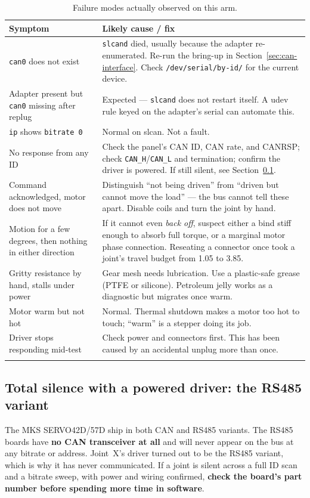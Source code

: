 \documentclass[11pt,letterpaper]{article}
\begin{document}
\begin{longtable}{p{}p{}}
\toprule
\textbf{Symptom} & \textbf{Likely cause / fix} \\ \midrule
\endhead
\texttt{can0} does not exist &
  \texttt{slcand} died, usually because the adapter re-enumerated. Re-run the
  bring-up in Section~\ref{sec:can-interface}. Check
  \texttt{/dev/serial/by-id/} for the current device. \\
Adapter present but \texttt{can0} missing after replug &
  Expected --- \texttt{slcand} does not restart itself. A udev rule keyed on the
  adapter's serial can automate this. \\
\texttt{ip} shows \texttt{bitrate 0} &
  Normal on slcan. Not a fault. \\
No response from any ID &
  Check the panel's CAN ID, CAN rate, and CANRSP; check \texttt{CAN\_H}/\texttt{CAN\_L}
  and termination; confirm the driver is powered. If still silent, see
  Section~\ref{sec:rs485}. \\
Command acknowledged, motor does not move &
  Distinguish ``not being driven'' from ``driven but cannot move the load'' --- the
  bus cannot tell these apart. Disable coils and turn the joint by hand. \\
Motion for a few degrees, then nothing in either direction &
  If it cannot even \emph{back off}, suspect either a bind stiff enough to absorb
  full torque, or a marginal motor phase connection. Reseating a connector once
  took a joint's travel budget from 1.05\textdegree{} to 3.85\textdegree{}. \\
Gritty resistance by hand, stalls under power &
  Gear mesh needs lubrication. Use a plastic-safe grease (PTFE or silicone).
  Petroleum jelly works as a diagnostic but migrates once warm. \\
Motor warm but not hot &
  Normal. Thermal shutdown makes a motor too hot to touch; ``warm'' is a stepper
  doing its job. \\
Driver stops responding mid-test &
  Check power and connectors first. This has been caused by an accidental unplug
  more than once. \\
\bottomrule
\caption{Failure modes actually observed on this arm.}
\end{longtable}

\subsection{Total silence with a powered driver: the RS485 variant}
\label{sec:rs485}
The MKS SERVO42D/57D ship in both CAN and RS485 variants. The RS485 boards have
\textbf{no CAN transceiver at all} and will never appear on the bus at any bitrate or
address. Joint~X's driver turned out to be the RS485 variant, which is why it has
never communicated. If a joint is silent across a full ID scan and a bitrate sweep,
with power and wiring confirmed, \textbf{check the board's part number before
spending more time in software}.
\end{document}
